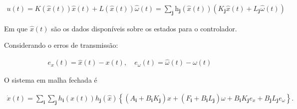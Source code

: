 \begin{gather}
    u(t)=K(\hat{x}(t)) \hat{x}(t) + L(\hat{x}(t)) \hat{\omega}(t)=\sum_{\mathbf{j} 
    } \mathrm{h}_{\mathbf{j}}(\hat{x}(t)) \left( K_{\mathbf{j}} \hat{x}(t)  + L_{\mathbf{j}} \hat{\omega}(t) \right)
\end{gather}

Em que $\hat{x}(t)$ são os dados disponíveis sobre os estados para o controlador.

\vspace{0.5cm}
Considerando o erros de transmissão:

\begin{gather}
    e_x(t)=\hat{x}(t)-x(t), \quad e_\omega(t)=\hat{\omega}(t)-\omega(t)
\end{gather}

O sistema em malha fechada é

\begin{gather}
    \dot{x}(t) = \sum_{\mathbf{i}} \sum_{\mathbf{j}} h_\mathbf{i}(x(t)) h_\mathbf{j}(\hat{x}) \left\{ (A_{\mathbf{i}} + B_{\mathbf{i}}K_{\mathbf{j}})x + (F_{\mathbf{i}} + B_{\mathbf{i}}L_{\mathbf{j}})\omega + B_{\mathbf{i}}K_{\mathbf{j}}e_x + B_{\mathbf{j}}L_{\mathbf{j}}e_\omega \right\}.
\end{gather}

